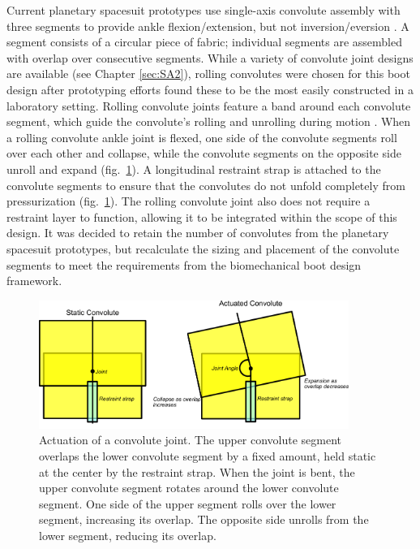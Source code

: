 \documentclass[defaultstyle,11pt]{comps}
\begin{document}
Current planetary spacesuit prototypes use single-axis convolute assembly with three segments to provide ankle flexion/extension, but not inversion/eversion \citep{Ross2002}.
A segment consists of a circular piece of fabric; individual segments are assembled with overlap over consecutive segments.
While a variety of convolute joint designs are available (see Chapter \ref{sec:SA2}), rolling convolutes were chosen for this boot design after prototyping efforts found these to be the most easily constructed in a laboratory setting.
Rolling convolute joints feature a band around each convolute segment, which guide the convolute's rolling and unrolling during motion \citep{Harris2001}.
When a rolling convolute ankle joint is flexed, one side of the convolute segments roll over each other and collapse, while the convolute segments on the opposite side unroll and expand (fig.~\ref{fig:SA3-convolute_actuation}).
A longitudinal restraint strap is attached to the convolute segments to ensure that the convolutes do not unfold completely from pressurization (fig.~\ref{fig:SA3-convolute_actuation}).
The rolling convolute joint also does not require a restraint layer to function, allowing it to be integrated within the scope of this design.
It was decided to retain the number of convolutes from the planetary spacesuit prototypes, but recalculate the sizing and placement of the convolute segments to meet the requirements from the biomechanical boot design framework.

\begin{figure}
\hypertarget{fig:SA3-convolute_actuation}{%
\centering
\includegraphics[width=0.9\textwidth,height=\textheight]{../fig/SA3/Convolute_Actuation.png}
\caption{Actuation of a convolute joint. The upper convolute segment overlaps the lower convolute segment by a fixed amount, held static at the center by the restraint strap. When the joint is bent, the upper convolute segment rotates around the lower convolute segment. One side of the upper segment rolls over the lower segment, increasing its overlap. The opposite side unrolls from the lower segment, reducing its overlap.}\label{fig:SA3-convolute_actuation}
}
\end{figure}
\end{document}
